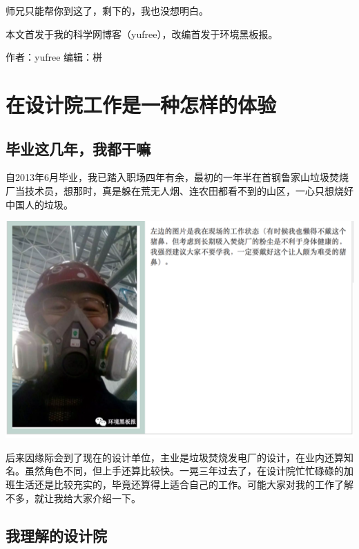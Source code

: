 \documentclass[
]{book}
\begin{document}
师兄只能帮你到这了，剩下的，我也没想明白。

本文首发于我的科学网博客（yufree），改编首发于环境黑板报。

作者：yufree
编辑：栟

\hypertarget{ux5728ux8bbeux8ba1ux9662ux5de5ux4f5cux662fux4e00ux79cdux600eux6837ux7684ux4f53ux9a8c}{%
\section{在设计院工作是一种怎样的体验}\label{ux5728ux8bbeux8ba1ux9662ux5de5ux4f5cux662fux4e00ux79cdux600eux6837ux7684ux4f53ux9a8c}}

\hypertarget{ux6bd5ux4e1aux8fd9ux51e0ux5e74ux6211ux90fdux5e72ux561b}{%
\subsection{毕业这几年，我都干嘛}\label{ux6bd5ux4e1aux8fd9ux51e0ux5e74ux6211ux90fdux5e72ux561b}}

自2013年6月毕业，我已踏入职场四年有余，最初的一年半在首钢鲁家山垃圾焚烧厂当技术员，想那时，真是躲在荒无人烟、连农田都看不到的山区，一心只想烧好中国人的垃圾。

\includegraphics[width=8.33in]{images/sisi1}

后来因缘际会到了现在的设计单位，主业是垃圾焚烧发电厂的设计，在业内还算知名。虽然角色不同，但上手还算比较快。一晃三年过去了，在设计院忙忙碌碌的加班生活还是比较充实的，毕竟还算得上适合自己的工作。可能大家对我的工作了解不多，就让我给大家介绍一下。

\hypertarget{ux6211ux7406ux89e3ux7684ux8bbeux8ba1ux9662}{%
\subsection{我理解的设计院}\label{ux6211ux7406ux89e3ux7684ux8bbeux8ba1ux9662}}
\end{document}
